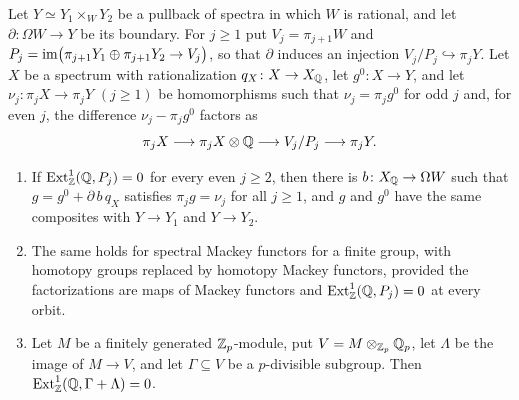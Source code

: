 \begin{lemma}\label{lem:paper-rational-correction}
Let $Y\simeq Y_1\times_WY_2$ be a pullback of spectra in which $W$ is rational, and let $\partial\colon\Omega W\to Y$ be its boundary.
For $j\ge1$ put $V_j=\pi_{j+1}W$ and $P_j=\operatorname{im}\bigl(\pi_{j+1}Y_1\oplus\pi_{j+1}Y_2\to V_j\bigr)$, so that $\partial$ induces an injection $V_j/P_j\hookrightarrow\pi_jY$.
Let $X$ be a spectrum with rationalization $q_X\colon X\to X_\mathbb Q$, let $g^0\colon X\to Y$, and let $\nu_j\colon\pi_jX\to\pi_jY$ $(j\ge1)$ be homomorphisms such that $\nu_j=\pi_jg^0$ for odd $j$ and, for even $j$, the difference $\nu_j-\pi_jg^0$ factors as
\[
 \pi_jX\longrightarrow\pi_jX\otimes\mathbb Q\longrightarrow V_j/P_j\longrightarrow\pi_jY.
\]
\begin{enumerate}
\item If $\operatorname{Ext}^1_\mathbb Z(\mathbb Q,P_j)=0$ for every even $j\ge2$, then there is $b\colon X_\mathbb Q\to\Omega W$ such that $g=g^0+\partial\,b\,q_X$ satisfies $\pi_jg=\nu_j$ for all $j\ge1$, and $g$ and $g^0$ have the same composites with $Y\to Y_1$ and $Y\to Y_2$.
\item The same holds for spectral Mackey functors for a finite group, with homotopy groups replaced by homotopy Mackey functors, provided the factorizations are maps of Mackey functors and $\operatorname{Ext}^1_\mathbb Z(\mathbb Q,P_j)=0$ at every orbit.
\item Let $M$ be a finitely generated $\mathbb Z_p$-module, put $V=M\otimes_{\mathbb Z_p}\mathbb Q_p$, let $\Lambda$ be the image of $M\to V$, and let $\Gamma\subseteq V$ be a $p$-divisible subgroup.
Then $\operatorname{Ext}^1_\mathbb Z(\mathbb Q,\Gamma+\Lambda)=0$.
\end{enumerate}
\end{lemma}
